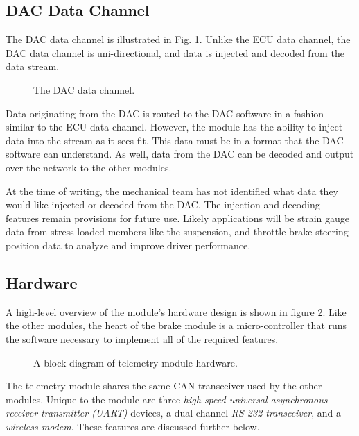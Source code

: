 \subsection{DAC Data Channel}

The DAC data channel is illustrated in Fig. \ref{fig:dac_data_channel}. Unlike the ECU data channel, the DAC data channel is uni-directional, and data is injected and decoded from the data stream.

\begin{figure}[H]
	\centering
%	
	\caption{The DAC data channel.}
	\label{fig:dac_data_channel}
\end{figure}

Data originating from the DAC is routed to the DAC software in a fashion similar to the ECU data channel. However, the module has the ability to inject data into the stream as it sees fit. This data must be in a format that the DAC software can understand. As well, data from the DAC can be decoded and output over the network to the other modules. 

At the time of writing, the mechanical team has not identified what data they would like injected or decoded from the DAC. The injection and decoding features remain provisions for future use. Likely applications will be strain gauge data from stress-loaded members like the suspension, and throttle-brake-steering position data to analyze and improve driver performance.

\subsection{Hardware}

A high-level overview of the module's hardware design is shown in figure \ref{fig:telemetry_hardware_design_block}. Like the other modules, the heart of the brake module is a micro-controller that runs the software necessary to implement all of the required features. 

\begin{figure}[H]
\centering
%
\caption{A block diagram of telemetry module hardware.}
\label{fig:telemetry_hardware_design_block}
\end{figure}


The telemetry module shares the same CAN transceiver used by the other modules. Unique to the module are three \emph{high-speed universal asynchronous receiver-transmitter (UART)} devices, a dual-channel \emph{RS-232 transceiver}, and a \emph{wireless modem}. These features are discussed further below.

